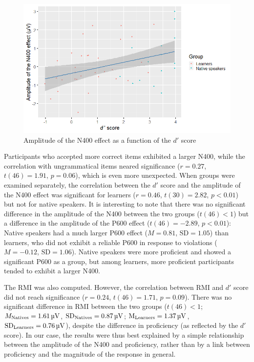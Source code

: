 \documentclass[output=paper,colorlinks,citecolor=brown,modfonts,nonflat]{../langscibook}
\begin{document}
 
\begin{figure}
\includegraphics[width=\textwidth]{figures/pelissier-img003.png}
\caption{Amplitude of the N400 effect as a function of the $d′$ score\label{fig:pelissier:3}}
\end{figure}

Participants who accepted more correct items exhibited a larger N400, while the correlation with ungrammatical items neared significance ($r = 0.27$, $t(46) = 1.91$, $p = 0.06$), which is even more unexpected.  When groups were examined separately, the correlation between the $d′$ score and the amplitude of the N400 effect was significant for learners ($r = 0.46$, $t(30) = 2.82$, $p < 0.01$) but not for native speakers. It is interesting to note that there was no significant difference in the amplitude of the N400 between the two groups ($t(46) < 1$) but a difference in the amplitude of the P600 effect ($t(46) = -2.89$, $p < 0.01$): Native speakers had a much larger P600 effect ($M = 0.81$, $\text{SD} = 1.05$) than learners, who did not exhibit a reliable P600 in response to violations ($M = -0.12$, $\text{SD} = 1.06$).  Native speakers were more proficient and showed a significant P600 as a group, but among learners, more proficient participants tended to exhibit a larger N400. 

The RMI was also computed. However, the correlation between RMI and $d′$ score did not reach significance ($r = 0.24$, $t(46) = 1.71$, $p = 0.09$). There was no significant difference in RMI between the two groups ($t(46) < 1$; $M_{\text{Natives}} = 1.61 \text{\,µV}$, $\text{SD\textsubscript{Natives}} = 0.87 \text{\,µV}$; $\text{M\textsubscript{Learners}} = 1.37 \text{\,µV}$, $\text{SD\textsubscript{Learners}} = 0.76 \text{\,µV}$), despite the difference in proficiency (as reflected by the $d′$ score). In our case, the results were thus best explained by a simple relationship between the amplitude of the N400 and proficiency, rather than by a link between proficiency and the magnitude of the response in general. 
\end{document}
